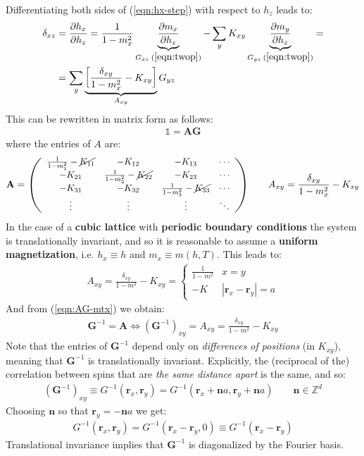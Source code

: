\documentclass[../../main.tex]{subfiles}
\begin{document}
Differentiating both sides of (\ref{eqn:hx-step}) with respect to $h_z$ leads to:
\begin{align*}
\delta_{xz} &= \pdv{h_x}{h_z} = \frac{1}{1-m_x^2} \underbrace{\pdv{m_x}{h_z}}_{G_{xz} \> (\ref{eqn:twop})} - \sum_y K_{xy} \underbrace{\pdv{m_y}{h_z}}_{G_{yz}\>(\ref{eqn:twop})} =\\
&= \sum_y \underbrace{\left[\frac{\delta_{xy}}{1-m_x^2} - K_{xy} \right]}_{A_{xy}} G_{yz}
\end{align*}
This can be rewritten in matrix form as follows:
\begin{align}\label{eqn:AG-mtx}
    \mathbb{1} = \textbf{A} \textbf{G}
\end{align}
where the entries of $A$ are:
\begin{align*}
    \textbf{A}  = \resizebox{8cm}{!}{$\left(\begin{array}{cccc}
        \frac{1}{1-m_1^2}  - \cancel{K_{11}} & -K_{12} & -K_{13} & \cdots \\ 
        -K_{21} & \frac{1}{1-m_2^2}  - \cancel{K_{22}} & -K_{23} & \cdots \\ 
        -K_{31} & -K_{32} & \frac{1}{1-m_3^2}  - \cancel{K_{33}} & \cdots \\ 
        \vdots & \vdots & \vdots & \ddots
        \end{array}\right)$} \qquad A_{xy} = \frac{\delta_{xy}}{1-m_x^2} - K_{xy} 
\end{align*}
In the case of a \textbf{cubic lattice} with \textbf{periodic boundary conditions} the system is translationally invariant, and so it is reasonable to assume a \textbf{uniform magnetization}, i.e. $h_x \equiv h$ and $m_x \equiv m(h,T)$. This leads to:
\begin{align*}
    A_{xy} = \frac{\delta_{xy}}{1-m^2} - K_{xy} = \begin{cases}
        \frac{1}{1-m^2} & x=y\\
        -K & |\bm{r}_x-\bm{r}_y| = a 
    \end{cases} 
\end{align*}
And from (\ref{eqn:AG-mtx}) we obtain:
\begin{align}\label{eqn:G-mtx}
    \textbf{G}^{-1} = \textbf{A}  \Leftrightarrow (\textbf{G}^{-1})_{xy} = A_{xy} = \frac{\delta_{xy}}{1-m^2} - K_{xy} 
\end{align}
Note that the entries of $\textbf{G}^{-1}$ depend only on \textit{differences of positions} (in $K_{xy}$), meaning that $\textbf{G}^{-1}$ is translationally invariant. Explicitly, the (reciprocal of the) correlation between spins that are \textit{the same distance apart} is the same, and so:
\begin{align*}
    (\textbf{G}^{-1})_{xy} \equiv G^{-1}(\bm{r}_x, \bm{r}_y) = G^{-1}(\bm{r}_x + \bm{n}a, \bm{r}_y + \bm{n}a) \qquad \bm{n} \in \mathbb{Z}^d
\end{align*}  
Choosing $\bm{n}$ so that $\bm{r}_y = -\bm{n}a$ we get:
\begin{align}\label{eqn:corr_translational_invariance}
    G^{-1}(\bm{r}_x, \bm{r}_y) = G^{-1}(\bm{r}_x-\bm{r}_y,0) \equiv G^{-1}(\bm{r}_x - \bm{r}_y)
\end{align}
Translational invariance implies that $\textbf{G}^{-1}$ is diagonalized by the Fourier basis. 
\end{document}
